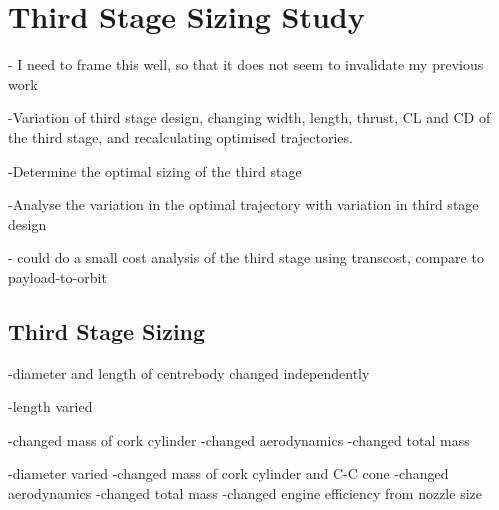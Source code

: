
\chapter{Third Stage Sizing Study}

- I need to frame this well, so that it does not seem to invalidate my previous work

-Variation of third stage design, changing width, length, thrust, CL and CD of the third stage, and recalculating optimised trajectories.

-Determine the optimal sizing of the third stage 

-Analyse the variation in the optimal trajectory with variation in third stage design



- could do a small cost analysis of the third stage using transcost, compare to payload-to-orbit

\section{Third Stage Sizing}

-diameter and length of centrebody changed independently

-length varied

-changed mass of cork cylinder
-changed aerodynamics
-changed total mass

-diameter varied
-changed mass of cork cylinder and C-C cone
-changed aerodynamics
-changed total mass
-changed engine efficiency from nozzle size